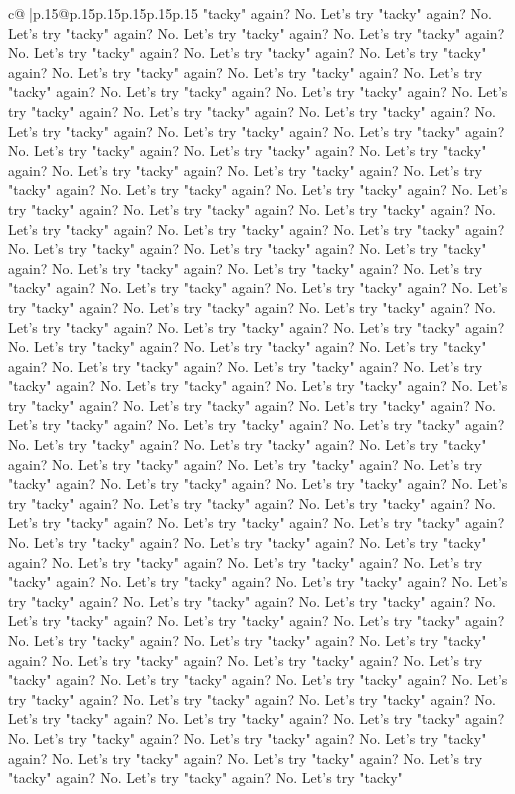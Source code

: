 \documentclass{article}
\begin{document}
{\begin{supertabular}{c@{$\;$}|p{.15\linewidth}@{}p{.15\linewidth}p{.15\linewidth}p{.15\linewidth}p{.15\linewidth}p{.15\linewidth}}
{{{"tacky" again? No. Let's try "tacky" again? No. Let's try "tacky" again? No. Let's try "tacky" again? No. Let's try "tacky" again? No. Let's try "tacky" again? No. Let's try "tacky" again? No. Let's try "tacky" again? No. Let's try "tacky" again? No. Let's try "tacky" again? No. Let's try "tacky" again? No. Let's try "tacky" again? No. Let's try "tacky" again? No. Let's try "tacky" again? No. Let's try "tacky" again? No. Let's try "tacky" again? No. Let's try "tacky" again? No. Let's try "tacky" again? No. Let's try "tacky" again? No. Let's try "tacky" again? No. Let's try "tacky" again? No. Let's try "tacky" again? No. Let's try "tacky" again? No. Let's try "tacky" again? No. Let's try "tacky" again? No. Let's try "tacky" again? No. Let's try "tacky" again? No. Let's try "tacky" again? No. Let's try "tacky" again? No. Let's try "tacky" again? No. Let's try "tacky" again? No. Let's try "tacky" again? No. Let's try "tacky" again? No. Let's try "tacky" again? No. Let's try "tacky" again? No. Let's try "tacky" again? No. Let's try "tacky" again? No. Let's try "tacky" again? No. Let's try "tacky" again? No. Let's try "tacky" again? No. Let's try "tacky" again? No. Let's try "tacky" again? No. Let's try "tacky" again? No. Let's try "tacky" again? No. Let's try "tacky" again? No. Let's try "tacky" again? No. Let's try "tacky" again? No. Let's try "tacky" again? No. Let's try "tacky" again? No. Let's try "tacky" again? No. Let's try "tacky" again? No. Let's try "tacky" again? No. Let's try "tacky" again? No. Let's try "tacky" again? No. Let's try "tacky" again? No. Let's try "tacky" again? No. Let's try "tacky" again? No. Let's try "tacky" again? No. Let's try "tacky" again? No. Let's try "tacky" again? No. Let's try "tacky" again? No. Let's try "tacky" again? No. Let's try "tacky" again? No. Let's try "tacky" again? No. Let's try "tacky" again? No. Let's try "tacky" again? No. Let's try "tacky" again? No. Let's try "tacky" again? No. Let's try "tacky" again? No. Let's try "tacky" again? No. Let's try "tacky" again? No. Let's try "tacky" again? No. Let's try "tacky" again? No. Let's try "tacky" again? No. Let's try "tacky" again? No. Let's try "tacky" again? No. Let's try "tacky" again? No. Let's try "tacky" again? No. Let's try "tacky" again? No. Let's try "tacky" again? No. Let's try "tacky" again? No. Let's try "tacky" again? No. Let's try "tacky" again? No. Let's try "tacky" again? No. Let's try "tacky" again? No. Let's try "tacky" again? No. Let's try "tacky" again? No. Let's try "tacky" again? No. Let's try "tacky" again? No. Let's try "tacky" again? No. Let's try "tacky" again? No. Let's try "tacky" again? No. Let's try "tacky" again? No. Let's try "tacky" again? No. Let's try "tacky" again? No. Let's try "tacky" again? No. Let's try "tacky" again? No. Let's try "tacky" again? No. Let's try "tacky" again? No. Let's try "tacky" again? No. Let's try "tacky" again? No. Let's try "tacky" again? No. Let's try "tacky" again? No. Let's try "tacky" again? No. Let's try "tacky" again? No. Let's try "tacky" again? No. Let's try "tacky" again? No. Let's try "tacky" again? No. Let's try "tacky" again? No. Let's try "tacky" again? No. Let's try "tacky" }}}
\end{supertabular}}
\end{document}
